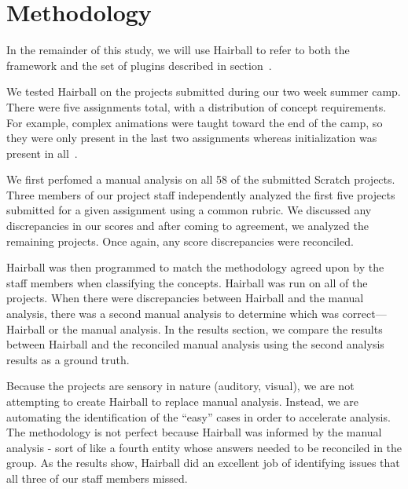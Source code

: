 \section{Methodology} 
In the remainder of this study, we will use Hairball to refer to both the
framework and the set of plugins described in section~.

We tested Hairball on the projects submitted during our two week summer camp.
There were five assignments total, with a distribution of concept
requirements. For example, complex animations were taught toward the end of the
camp, so they were only present in the last two assignments whereas
initialization was present in all~\cite{Franklin:2013:SBO}.

We first perfomed a manual analysis on all 58 of the submitted Scratch
projects.  Three members of our project staff independently analyzed the first
five projects submitted for a given assignment using a common rubric. We
discussed any discrepancies in our scores and after coming to agreement, we
analyzed the remaining projects.  Once again, any score discrepancies were
reconciled.

Hairball was then programmed to match the methodology agreed upon by the staff
members when classifying the concepts.  Hairball was run on all of the
projects.  When there were discrepancies between Hairball and the manual
analysis, there was a second manual analysis to determine which was
correct---Hairball or the manual analysis.  In the results section, we compare
the results between Hairball and the reconciled manual analysis using the
second analysis results as a ground truth.

Because the projects are sensory in nature (auditory, visual), we are not
attempting to create Hairball to replace manual analysis.  Instead, we are
automating the identification of the ``easy'' cases in order to accelerate
analysis.  The methodology is not perfect because Hairball was informed by the
manual analysis - sort of like a fourth entity whose answers needed to be
reconciled in the group.  As the results show, Hairball did an excellent job of
identifying issues that all three of our staff members missed.
